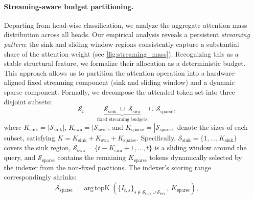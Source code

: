 \documentclass{article}
\newcommand{\kmax}{K}
\begin{document}
\paragraph{Streaming-aware budget partitioning.}
Departing from head-wise classification, we analyze the aggregate attention mass distribution across all heads. Our empirical analysis reveals a persistent \emph{streaming pattern}: the sink and sliding window regions consistently capture a substantial share of the attention weight (see \cref{fig:streaming_mass}). Recognizing this as a stable structural feature, we formalize their allocation as a deterministic budget. This approach allows us to partition the attention operation into a hardware-aligned fixed streaming component (sink and sliding window) and a dynamic sparse component. Formally, we decompose the attended token set into three disjoint subsets:
\begin{equation}
\label{eq:set_split}
\mathcal{S}_t \;=\; \underbrace{\mathcal{S}_{\text{sink}} \;\cup\; \mathcal{S}_{\text{swa}}}_{\text{fixed streaming budgets}} \cup\, \mathcal{S}_{\text{sparse}},
\end{equation}
where $K_{\text{sink}} = |\mathcal{S}_{\text{sink}}|$, $K_{\text{swa}} = |\mathcal{S}_{\text{swa}}|$, and $K_{\text{sparse}} = |\mathcal{S}_{\text{sparse}}|$ denote the sizes of each subset, satisfying $\kmax = K_{\text{sink}} + K_{\text{swa}} + K_{\text{sparse}}$. Specifically, $\mathcal{S}_{\text{sink}} = \{1, \ldots, K_{\text{sink}}\}$ covers the sink region, $\mathcal{S}_{\text{swa}} = \{t - K_{\text{swa}} + 1, \ldots, t\}$ is a sliding window around the query, and $\mathcal{S}_{\text{sparse}}$ contains the remaining $K_{\text{sparse}}$ tokens dynamically selected by the indexer from the non-fixed positions. The indexer's scoring range correspondingly shrinks:
\begin{equation}
\label{eq:streaming_indexer}
\mathcal{S}_{\text{sparse}} = \mathop{\mathrm{arg\,topK}} (\{I_{t,s}\}_{s \notin \mathcal{S}_{\text{sink}} \cup \mathcal{S}_{\text{swa}}}, \; K_{\text{sparse}}),
\end{equation}
\end{document}
